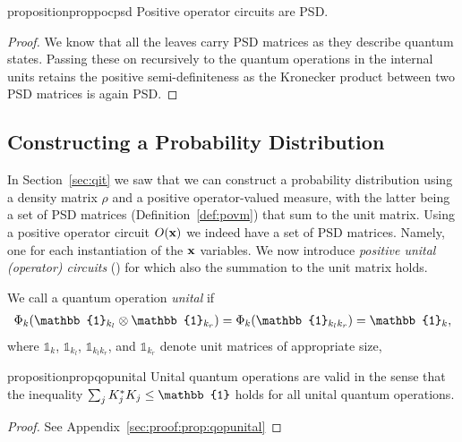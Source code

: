 \begin{restatable}{proposition}{proppocpsd}
	\label{prop:pocpsd}
	Positive operator circuits are PSD.
\end{restatable}


\begin{proof}
	We know that all the leaves carry PSD matrices as they describe quantum states. Passing these on recursively to the quantum operations in the internal units retains the positive semi-definiteness as the Kronecker product between two PSD matrices is again PSD.
\end{proof}






\subsection{Constructing a Probability Distribution}


In Section~\ref{sec:qit} we saw that we can construct a probability distribution using a density matrix $\rho$ and a positive operator-valued measure, with the latter being a set of PSD matrices (\cf Definition~\ref{def:povm}) that sum to the unit matrix. Using a positive operator circuit $O(\mathbf{x})$ we indeed have a set of PSD matrices. Namely, one for each instantiation of the $\mathbf{x}$ variables. We now introduce \textit{positive unital (operator) circuits} (\puncs) for which also the summation to the unit matrix holds.

\begin{definition}
	\label{def:cp_unital}
	We call a quantum operation \textit{unital} if
	\begin{align}
		\qop_k(\mathbb{1}_{k_l} \otimes \mathbb{1}_{k_r})
		=\qop_k(\mathbb{1}_{k_l k_r})
		=  \mathbb{1}_k,
	\end{align}
	where $\mathbb{1}_{k}$, $\mathbb{1}_{k_l}$, $\mathbb{1}_{k_l k_r}$, and $\mathbb{1}_{k_r}$  denote unit matrices of appropriate size,
\end{definition}

\begin{restatable}{proposition}{propqopunital}
	\label{prop:qopunital}
	Unital quantum operations are valid in the sense that the inequality $\sum_j \kraus_{j}^* \kraus_{j} \leq \mathbb{1}$ holds for all unital quantum operations.
\end{restatable}

\begin{proof}
	See Appendix~\ref{sec:proof:prop:qopunital}
\end{proof}


